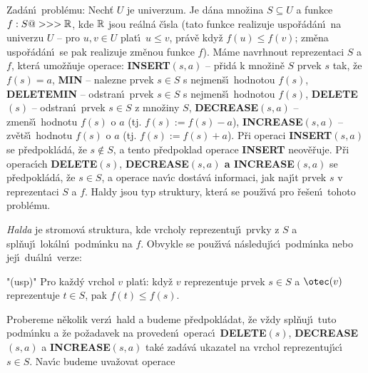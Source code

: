 \documentclass[a4paper,12pt]{article}
\begin{document}
\flushpar Zad\'an\'\i\ probl\'emu: Nech\v t $U$ je univerzum. Je d\'ana mno\v zina 
$S\subseteq U$ a funkce $f:S@>>>\Bbb R$, kde $\Bbb R$ jsou re\'aln\'a \v c\'\i sla (tato 
funkce realizuje uspo\v r\'ad\'an\'\i\ na univerzu $U$ -- pro $u,
v\in U$ plat\'\i\ 
$u\le v$, pr\'av\v e kdy\v z $f(u)\le f(v)$; zm\v ena uspo\v r\'ad\'an\'\i\ se pak realizuje 
zm\v enou funkce $f$).
M\'ame navrhnout reprezentaci $S$ a $f$, kter\'a umo\v z\v nuje 
operace:\newline 
{\bf INSERT$(s,a)$} -- p\v rid\'a k mno\v zin\v e $S$ prvek $s$ tak, \v ze 
$f(s)=a$,\newline 
{\bf MIN} -- nalezne prvek $s\in S$ s nejmen\v s\'\i\ hodnotou 
$f(s)$,\newline 
{\bf DELETEMIN} -- odstran\'\i\ prvek $s\in S$ s nejmen\v s\'\i\ hodnotou 
$f(s)$,\newline 
{\bf DELETE$(s)$} -- odstran\'\i\ prvek $s\in S$ z mno\v ziny $S$,\newline 
{\bf DECREASE$(s,a)$} -- zmen\v s\'\i\ hodnotu $f(s)$ o $a$ (tj. 
$f(s):=f(s)-a$),\newline 
{\bf INCREASE$(s,a)$} -- zv\v et\v s\'\i\ hodnotu $f(s)$ o $a$ (tj. 
$f(s):=f(s)+a$).\newline 
P\v ri operaci {\bf INSERT$(s,a)$} se p\v redpokl\'ad\'a, \v ze $
s\notin S$, a tento 
p\v redpoklad operace {\bf INSERT} neov\v e\v ruje. P\v ri operac\'\i ch {\bf DE\-LE\-TE$
(s)$},
{\bf DECREASE$(s,a)$ a INCREASE$(s,a)$} se p\v red\-pokl\'ad\'a, \v ze $
s\in S$, 
a operace nav\'\i c dost\'av\'a informaci, jak naj\'\i t  
prvek $s$ v reprezentaci $S$ a $f$. Haldy jsou typ 
struktury, kter\'a se pou\v z\'\i v\'a pro \v re\v sen\'\i\ tohoto probl\'emu. 
\medskip

\flushpar\emph{Halda} je stromov\'a struktura, kde vrcholy 
reprezentuj\'\i\ prvky z $S$ a spl\v nuj\'\i\ lok\'aln\'\i\ podm\'\i nku na 
$f$. Obvykle se pou\v z\'\i v\'a n\'asleduj\'\i c\'\i\ podm\'\i nka nebo jej\'\i\ 
du\'aln\'\i\ verze:
\bigskip
\roster
\item"{(usp)}"
Pro ka\v zd\'y vrchol $v$ plat\'\i : kdy\v z $v$ reprezentuje prvek 
$s\in S$ a $\otec(v)$ reprezentuje $t\in S$, pak $f(t)\le f(s)$.
\endroster
\medskip

\flushpar Probereme n\v ekolik verz\'\i\ hald a budeme 
p\v redpokl\'adat, \v ze v\v zdy spl\v nuj\'\i\ tuto podm\'\i nku a \v ze po\v zadavek na 
proveden\'\i\ operac\'\i\ {\bf DELETE$(s)$}, {\bf DECREA\-SE$(s,a
)$} a {\bf INCREASE$(s,a)$ }
tak\'e zad\'av\'a ukazatel na vrchol repre\-zentuj\'\i c\'\i\ $s\in 
S$.  Nav\'\i c budeme 
uva\v zovat operace
\medskip
\end{document}
